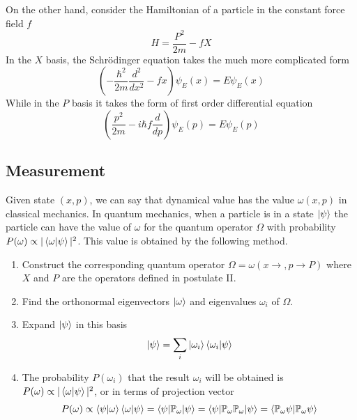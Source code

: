 \documentclass[../../../main.tex]{subfiles}
\begin{document}
On the other hand, consider the Hamiltonian of a particle in the constant force field $f$
\begin{equation*}
    H=\frac{P^2 }{2m }-fX
\end{equation*}
In the $X$ basis, the Schrödinger equation takes the much more complicated form
\begin{equation*}
    \left( -\frac{\hbar^2}{2m }\frac{d^2 }{dx^2}-fx \right)\psi_E(x)=E\psi_E(x)
\end{equation*}
While in the $P$ basis it takes the form of first order differential equation
\begin{equation*}
    \left( \frac{p^2 }{2m }-i \hbar f \frac{d }{dp }     \right)\psi_E (p)=E\psi_E(p)
\end{equation*}

\subsection{Measurement}
Given state $(x,p)$, we can say that dynamical value has the value $\omega(x,p)$ in classical mechanics.
In quantum mechanics, when a particle is in a state $\ket{\psi } $ the particle can have the value of $\omega$ for the quantum operator $\Omega$ with probability $P(\omega)\propto|\braket{\omega|\psi}  |^2$.
This value is obtained by the following method.
\begin{enumerate}
    \item Construct the corresponding quantum operator $\Omega=\omega(x \rightarrow ,p \rightarrow P)$ where $X$ and $P$ are the operators defined in postulate II.
    \item Find the orthonormal eigenvectors $\ket{\omega} $ and eigenvalues $\omega_i$ of $\Omega$.
    \item Expand $\ket{\psi } $ in this basis
          \begin{equation*}
              \ket{\psi }=\sum_i  \ket{\omega_i } \braket{\omega_i |\psi}
          \end{equation*}
    \item The probability $P(\omega_i)$ that the result $\omega_i$ will be obtained is $P(\omega)\propto|\braket{\omega|\psi}  |^2$, or in terms of projection vector
          \begin{equation*}
              P(\omega)\propto \braket{\psi|\omega } \braket{\omega|\psi}=\braket{\psi|\mathbb{P}_\omega|\psi  }=\braket{\psi|\mathbb{P } _\omega \mathbb{P } _\omega |\psi   }=\braket{\mathbb{P } _\omega \psi| \mathbb{P } _\omega \psi  }
          \end{equation*}
\end{enumerate}
\end{document}
